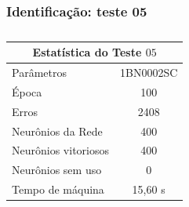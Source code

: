 \documentclass[aspectratio=10]{beamer} %
\begin{document}
\begin{frame}
	\frametitle{Identificação: teste 05}
\begin{table}[H]
	\centering
	\caption{}
	\label{Estatistica do teste $05$}
	\begin{tabular}{@{}lc@{}}
		\toprule
		\multicolumn{2}{c}{Estatística do Teste $05$}         \\ \midrule
		Parâmetros                  & 1BN0002SC \\
		Época                       & 100       \\
		Erros                       & 2408       \\
		Neurônios da Rede           & 400       \\
		Neurônios vitoriosos        & 400       \\
		Neurônios sem uso           & 0         \\
		Tempo de máquina            & 15,60 s   \\ \bottomrule
	\end{tabular}
\end{table} 
\end{frame}
\end{document}
